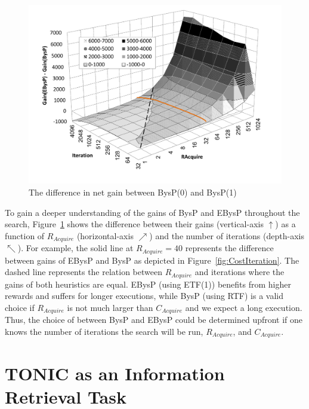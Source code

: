 \documentclass[journal]{IEEEtran}
\begin{document}
\begin{figure}
\centering
\includegraphics[width=0.7\linewidth]{reward.pdf}%
\caption{The difference in net gain between BysP(0) and BysP(1)}%
\label{fig:reward3d}
\end{figure}



To gain a deeper understanding of the gains of BysP and EBysP throughout the
search, Figure~\ref{fig:reward3d} shows the difference between their gains (vertical-axis $\uparrow$) as a function of \(R_{Acquire}\)
(horizontal-axis $\nearrow$) and the number of iterations (depth-axis
$\nwarrow$). For example, the solid line at \(R_{Acquire}=40\) represents the
difference between gains of EBysP and BysP as depicted in
Figure~\ref{fig:CostIteration}. The dashed line represents the relation between
\(R_{Acquire}\) and iterations where the gains of both heuristics are equal. EBysP (using ETF(1))
benefits from higher rewards and suffers for longer executions, while BysP (using RTF) is a valid choice if $R_{Acquire}$ is not much larger than $C_{Acquire}$ and we expect a long execution. 
Thus, the choice of between BysP and EBysP could be determined upfront if one knows the
number of iterations the search will be run, $R_{Acquire}$, and $C_{Acquire}$. 


\section{TONIC as an Information Retrieval Task}
\label{sec:ir}
\end{document}
